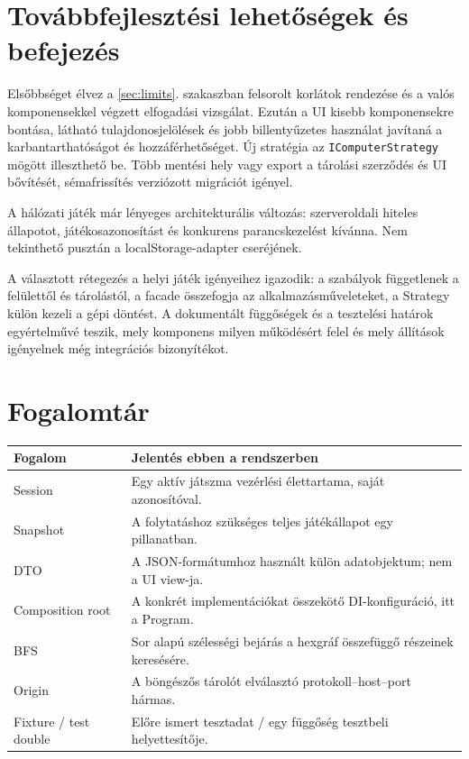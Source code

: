 \documentclass[11pt,a4paper]{article}
\newcommand{\code}[1]{\nolinkurl{#1}}
\begin{document}
\section{Továbbfejlesztési lehetőségek és befejezés}
Elsőbbséget élvez a \ref{sec:limits}. szakaszban felsorolt korlátok rendezése és a valós komponensekkel végzett elfogadási vizsgálat. Ezután a UI kisebb komponensekre bontása, látható tulajdonosjelölések és jobb billentyűzetes használat javítaná a karbantarthatóságot és hozzáférhetőséget. Új stratégia az \code{IComputerStrategy} mögött illeszthető be. Több mentési hely vagy export a tárolási szerződés és UI bővítését, sémafrissítés verziózott migrációt igényel.

A hálózati játék már lényeges architekturális változás: szerveroldali hiteles állapotot, játékosazonosítást és konkurens parancskezelést kívánna. Nem tekinthető pusztán a localStorage-adapter cseréjének.

A választott rétegezés a helyi játék igényeihez igazodik: a szabályok függetlenek a felülettől és tárolástól, a facade összefogja az alkalmazásműveleteket, a Strategy külön kezeli a gépi döntést. A dokumentált függőségek és a tesztelési határok egyértelművé teszik, mely komponens milyen működésért felel és mely állítások igényelnek még integrációs bizonyítékot.

\section*{Fogalomtár}
\begin{tabularx}{\linewidth}{@{}lY@{}}\toprule
Fogalom & Jelentés ebben a rendszerben \\\midrule
Session & Egy aktív játszma vezérlési élettartama, saját azonosítóval.\\
Snapshot & A folytatáshoz szükséges teljes játékállapot egy pillanatban.\\
DTO & A JSON-formátumhoz használt külön adatobjektum; nem a UI view-ja.\\
Composition root & A konkrét implementációkat összekötő DI-konfiguráció, itt a Program.\\
BFS & Sor alapú szélességi bejárás a hexgráf összefüggő részeinek keresésére.\\
Origin & A böngészős tárolót elválasztó protokoll--host--port hármas.\\
Fixture / test double & Előre ismert tesztadat / egy függőség tesztbeli helyettesítője.\\\bottomrule
\end{tabularx}
\end{document}
